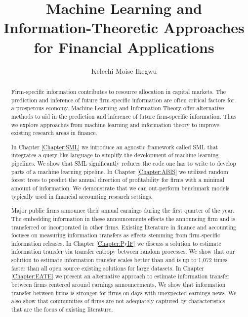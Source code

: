 \documentclass[12pt,edeposit,fullpage]{uiucthesis2014}
\begin{document}
\title{Machine Learning and Information-Theoretic Approaches for Financial Applications}
\author{Kelechi Moise Ikegwu}
\phdthesis
{}
\maketitle

\frontmatter

\begin{abstract}

Firm-specific information contributes to resource allocation in capital markets.  The prediction and inference of future firm-specific information are often critical factors for a prosperous economy.  Machine Learning and Information Theory offer alternative methods to aid in the prediction and inference of future firm-specific information.  Thus we explore approaches from machine learning and information theory to improve existing research areas in finance.  

In Chapter \ref{Chapter:SML} we introduce an agnostic framework called SML that integrates a query-like language to simplify the development of machine learning pipelines.  We show that SML significantly reduces the code one has to write to develop parts of a machine learning pipeline. In Chapter \ref{Chapter:ABIS} we utilized random forest trees to predict the annual direction of profitability for firms with a minimal amount of information.  We demonstrate that we can out-perform benchmark models typically used in financial accounting research settings.  

Major public firms announce their annual earnings during the first quarter of the year.  The embedding information in these announcements effects the announcing firm and is transferred or incorporated in other firms.  Existing literature in finance and accounting focuses on measuring information transfers as effects stemming from firm-specific information releases.  In Chapter \ref{Chapter:PyIF} we discuss a solution to estimate information transfer via transfer entropy between random processes.  We show that our solution to estimate information transfer scales better than and is up to 1,072 times faster than all open source existing solutions for large datasets.  In Chapter \ref{Chapter:EATE} we present an alternative approach to estimate information transfer between firms centered around earnings announcements.  We show that information transfer between firms is stronger for firms on days with unexpected earnings news.  We also show that communities of firms are not adequately captured by characteristics that are the focus of existing literature.

\end{abstract}
\end{document}
